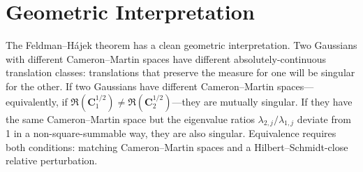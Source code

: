 \documentclass[12pt, oneside]{book}
\theoremstyle{plain}
\theoremstyle{definition}
\newcommand{\ran}{\mathfrak{R}}
\begin{document}
\section{Geometric Interpretation}

The Feldman--H\'ajek theorem has a clean geometric interpretation. Two Gaussians with different Cameron--Martin spaces have different absolutely-continuous translation classes: translations that preserve the measure for one will be singular for the other. If two Gaussians have different Cameron--Martin spaces---equivalently, if $\ran(\mathbf{C}_1^{1/2}) \neq \ran(\mathbf{C}_2^{1/2})$---they are mutually singular. If they have the same Cameron--Martin space but the eigenvalue ratios $\lambda_{2,j}/\lambda_{1,j}$ deviate from 1 in a non-square-summable way, they are also singular. Equivalence requires both conditions: matching Cameron--Martin spaces and a Hilbert--Schmidt-close relative perturbation.
\end{document}
